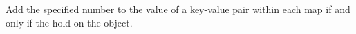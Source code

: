 Add the specified number to the value of a key-value pair within each map if and
only if the  hold on the object.



